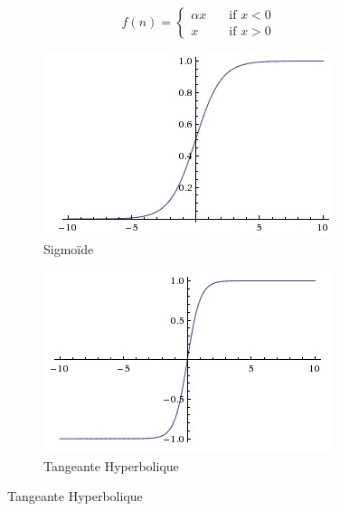\begin{equation}
	f(n) =
  \begin{cases}
    \alpha x & \quad \text{if } x < 0 \\
    x  & \quad \text{if } x > 0
  \end{cases}
\label{eq:leakyrelu}
\end{equation}

\begin{figure}[!htb]
  \begin{subfigure}{0.49\textwidth}
		\includegraphics[width=\linewidth]{figures/sigmoid.jpeg}
		\caption{Sigmoïde} \label{fig:sigmoid}
	\end{subfigure}
	\hspace*{\fill} %
	\begin{subfigure}{0.49\textwidth}
		\includegraphics[width=\linewidth]{figures/tanh.jpeg}
		\caption{Tangeante Hyperbolique} \label{fig:tanh}
	\end{subfigure}

\end{figure}
